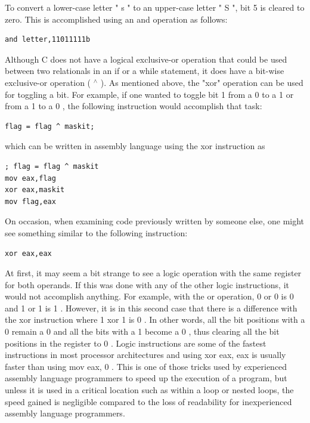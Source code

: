 \documentclass[10pt]{article}
\begin{document}
To convert a lower-case letter " s " to an upper-case letter " S ", bit 5 is cleared to zero. This is accomplished using an and operation as follows:

\begin{verbatim}
and letter,11011111b
\end{verbatim}

Although C does not have a logical exclusive-or operation that could be used between two relationals in an if or a while statement, it does have a bit-wise exclusive-or operation ( ${ }^{\wedge}$ ). As mentioned above, the "xor" operation can be used for toggling a bit. For example, if one wanted to toggle bit 1 from a 0 to a 1 or from a 1 to a 0 , the following instruction would accomplish that task:

\begin{verbatim}
flag = flag ^ maskit;
\end{verbatim}

which can be written in assembly language using the xor instruction as

\begin{verbatim}
; flag = flag ^ maskit
mov eax,flag
xor eax,maskit
mov flag,eax
\end{verbatim}

On occasion, when examining code previously written by someone else, one might see something similar to the following instruction:

\begin{verbatim}
xor eax,eax
\end{verbatim}

At first, it may seem a bit strange to see a logic operation with the same register for both operands. If this was done with any of the other logic instructions, it would not accomplish anything. For example, with the or operation, 0 or 0 is 0 and 1 or 1 is 1 . However, it is in this second case that there is a difference with the xor instruction where 1 xor 1 is 0 . In other words, all the bit positions with a 0 remain a 0 and all the bits with a 1 become a 0 , thus clearing all the bit positions in the register to 0 . Logic instructions are some of the fastest instructions in most processor architectures and using xor eax, eax is usually faster than using mov eax, 0 . This is one of those tricks used by experienced assembly language programmers to speed up the execution of a program, but unless it is used in a critical location such as within a loop or nested loops, the speed gained is negligible compared to the loss of readability for inexperienced assembly language programmers.
\end{document}
